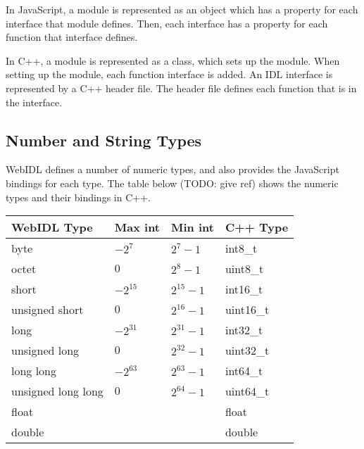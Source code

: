 In JavaScript, a module is represented as an object which has a property for each interface that module defines. Then, each interface has a property for each function that interface defines. 

In C++, a module is represented as a class, which sets up the module. When setting up the module, each function interface is added. An IDL interface is represented by a C++ header file. The header file defines each function that is in the interface.


\subsection{Number and String Types} %
\label{sub:number_types}
WebIDL defines a number of numeric types, and also provides the JavaScript bindings for each type. The table below (TODO: give ref) shows the numeric types and their bindings in C++.

\begin{table}[h]
\begin{tabular}{l|lll}
\textbf{WebIDL Type} & \textbf{Max int} & \textbf{Min int} & \textbf{C++ Type}  \\ \hline
byte                 & $-2^{7}$         & $2^{7}-1$        & int8\_t            \\
octet                & $0$              & $2^{8}-1$        & uint8\_t           \\
short                & $-2^{15}$        & $2^{15}-1$       & int16\_t           \\
unsigned short       & $0$              & $2^{16}-1$       & uint16\_t          \\
long                 & $-2^{31}$        & $2^{31}-1$       & int32\_t           \\
unsigned long        & $0$              & $2^{32}-1$       & uint32\_t          \\
long long            & $-2^{63}$        & $2^{63}-1$       & int64\_t           \\
unsigned long long   & $0$              & $2^{64}-1$       & uint64\_t          \\
float                &                  &                  & float              \\
double               &                  &                  & double           
\end{tabular}
\end{table}

